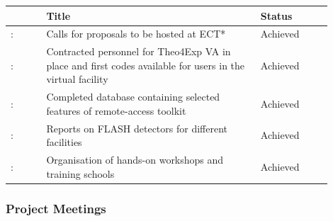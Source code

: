 {\fontsize{9}{11}\selectfont
\begin{center}
  \begin{tabular}[t]{!{\color{mygray}\vrule}p{0.10\linewidth}!
  {\color{mygray}\vrule}p{0.60\linewidth}!
  {\color{mygray}\vrule}p{0.20\linewidth}!{\color{mygray}\vrule} } \hline
     & {\bf Title} & {\bf Status} \\ \hline
    : &Calls for proposals to be hosted at ECT*&  Achieved  \\ \hline
    : & Contracted personnel for Theo4Exp VA in place and first codes available for users in the virtual facility & Achieved \\ \hline    
    : & Completed database containing selected features of remote-access toolkit & Achieved \\ \hline 
    : & Reports on FLASH detectors for different facilities & Achieved \\ \hline 
    : & 	Organisation of hands-on workshops and training schools & Achieved \\ \hline 
  \end{tabular}
\end{center}
}

\subsubsection*{Project Meetings}










